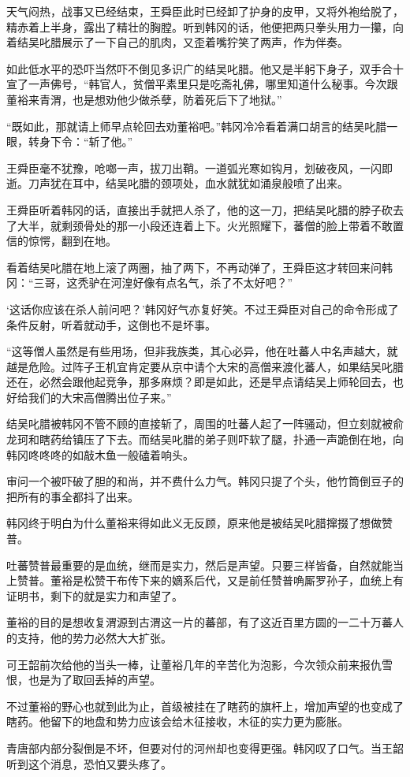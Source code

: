 天气闷热，战事又已经结束，王舜臣此时已经卸了护身的皮甲，又将外袍给脱了，精赤着上半身，露出了精壮的胸膛。听到韩冈的话，他便把两只拳头用力一攥，向着结吴叱腊展示了一下自己的肌肉，又歪着嘴狞笑了两声，作为伴奏。

如此低水平的恐吓当然吓不倒见多识广的结吴叱腊。他又是半躬下身子，双手合十宣了一声佛号，“韩官人，贫僧平素里只是吃斋礼佛，哪里知道什么秘事。今次跟董裕来青渭，也是想劝他少做杀孽，防着死后下了地狱。”

“既如此，那就请上师早点轮回去劝董裕吧。”韩冈冷冷看着满口胡言的结吴叱腊一眼，转身下令：“斩了他。”

王舜臣毫不犹豫，呛啷一声，拔刀出鞘。一道弧光寒如钩月，划破夜风，一闪即逝。刀声犹在耳中，结吴叱腊的颈项处，血水就犹如涌泉般喷了出来。

王舜臣听着韩冈的话，直接出手就把人杀了，他的这一刀，把结吴叱腊的脖子砍去了大半，就剩颈骨处的那一小段还连着上下。火光照耀下，蕃僧的脸上带着不敢置信的惊愕，翻到在地。

看着结吴叱腊在地上滚了两圈，抽了两下，不再动弹了，王舜臣这才转回来问韩冈：“三哥，这秃驴在河湟好像有点名气，杀了不太好吧？”

‘这话你应该在杀人前问吧？’韩冈好气亦复好笑。不过王舜臣对自己的命令形成了条件反射，听着就动手，这倒也不是坏事。

“这等僧人虽然是有些用场，但非我族类，其心必异，他在吐蕃人中名声越大，就越是危险。过阵子王机宜肯定要从京中请个大宋的高僧来渡化蕃人，如果结吴叱腊还在，必然会跟他起竞争，那多麻烦？即是如此，还是早点请结吴上师轮回去，也好给我们的大宋高僧腾出位子来。”

结吴叱腊被韩冈不管不顾的直接斩了，周围的吐蕃人起了一阵骚动，但立刻就被俞龙珂和瞎药给镇压了下去。而结吴叱腊的弟子则吓软了腿，扑通一声跪倒在地，向韩冈咚咚咚的如敲木鱼一般磕着响头。

审问一个被吓破了胆的和尚，并不费什么力气。韩冈只提了个头，他竹筒倒豆子的把所有的事全都抖了出来。

韩冈终于明白为什么董裕来得如此义无反顾，原来他是被结吴叱腊撺掇了想做赞普。

吐蕃赞普最重要的是血统，继而是实力，然后是声望。只要三样皆备，自然就能当上赞普。董裕是松赞干布传下来的嫡系后代，又是前任赞普唃厮罗孙子，血统上有证明书，剩下的就是实力和声望了。

董裕的目的是想收复渭源到古渭这一片的蕃部，有了这近百里方圆的一二十万蕃人的支持，他的势力必然大大扩张。

可王韶前次给他的当头一棒，让董裕几年的辛苦化为泡影，今次领众前来报仇雪恨，也是为了取回丢掉的声望。

不过董裕的野心也就到此为止，首级被挂在了瞎药的旗杆上，增加声望的也变成了瞎药。他留下的地盘和势力应该会给木征接收，木征的实力更为膨胀。

青唐部内部分裂倒是不坏，但要对付的河州却也变得更强。韩冈叹了口气。当王韶听到这个消息，恐怕又要头疼了。

